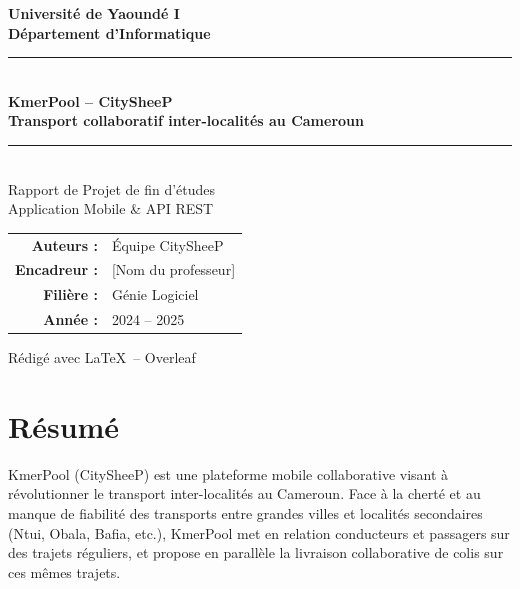\documentclass[12pt, a4paper]{report}
\begin{document}

\begin{titlepage}
  \centering
  \vspace*{1cm}

  {\Large\bfseries Université de Yaoundé I\\[4pt]
  \normalsize Département d'Informatique}\\[2cm]

  \rule{\linewidth}{2pt}\\[0.4cm]
  {\LARGE\bfseries\color{primaryBlue}
    KmerPool -- CitySheeP\\[0.3cm]
    \large Transport collaboratif inter-localités au Cameroun}\\[0.2cm]
  \rule{\linewidth}{2pt}\\[1.5cm]

  {\large Rapport de Projet de fin d'études}\\[0.5cm]
  {\normalsize Application Mobile \& API REST}\\[2cm]

  \begin{tabular}{rl}
    \textbf{Auteurs :}    & Équipe CitySheeP \\[4pt]
    \textbf{Encadreur :}  & [Nom du professeur] \\[4pt]
    \textbf{Filière :}    & Génie Logiciel \\[4pt]
    \textbf{Année :}      & 2024 -- 2025 \\
  \end{tabular}

  \vfill
  {\small Rédigé avec \LaTeX\ -- Overleaf}
\end{titlepage}

\setcounter{page}{1}

\chapter*{Résumé}

KmerPool (CitySheeP) est une plateforme mobile collaborative visant à révolutionner le
transport inter-localités au Cameroun. Face à la cherté et au manque de fiabilité des
transports entre grandes villes et localités secondaires (Ntui, Obala, Bafia, etc.),
KmerPool met en relation conducteurs et passagers sur des trajets réguliers, et propose
en parallèle la livraison collaborative de colis sur ces mêmes trajets.
\end{document}
